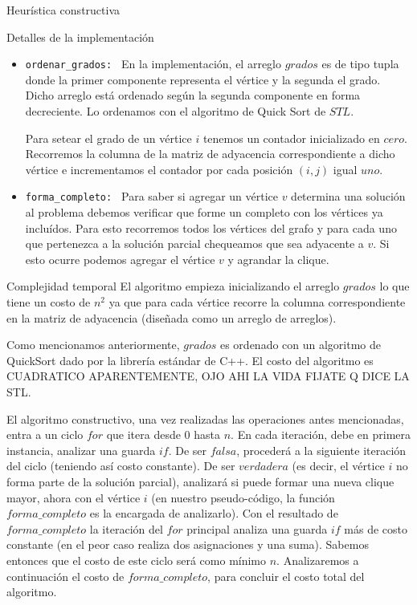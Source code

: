 \begin{section}{Heurística constructiva}
\begin{subsection}{Detalles de la implementación}
			\begin{itemize}
				\item \texttt{ordenar\_grados: } En la implementación, el arreglo $grados$ es de tipo tupla donde la primer componente representa el vértice y la segunda el grado. Dicho arreglo está ordenado según la segunda componente en forma decreciente. Lo ordenamos con el algoritmo de Quick Sort de $STL$.
				
				Para setear el grado de un vértice $i$ tenemos un contador inicializado en $cero$. Recorremos la columna de la matriz de adyacencia correspondiente a dicho vértice e incrementamos el contador por cada posición $(i,j)$ igual $uno$.
				\item \texttt{forma\_completo: } Para saber si agregar un vértice $v$ determina una solución al problema debemos verificar que forme un completo con los vértices ya incluídos. Para esto recorremos todos los vértices del grafo y para cada uno que pertenezca a la solución parcial chequeamos que sea adyacente a $v$. Si esto ocurre podemos agregar el vértice $v$ y agrandar la clique.
			\end{itemize}
		\end{subsection}
		\begin{subsection}{Complejidad temporal}
			El algoritmo empieza inicializando el arreglo $grados$ lo que tiene un costo de $n^2$ ya que para cada vértice recorre la columna correspondiente en la matriz de adyacencia (diseñada como un arreglo de arreglos).
			
			Como mencionamos anteriormente, $grados$ es ordenado con un algoritmo de QuickSort dado por la librería estándar de C++. El costo del algoritmo es CUADRATICO APARENTEMENTE, OJO AHI LA VIDA FIJATE Q DICE LA STL.
			
			El algoritmo constructivo, una vez realizadas las operaciones antes mencionadas, entra a un ciclo $for$ que itera desde $0$ hasta $n$. En cada iteración, debe en primera instancia, analizar una guarda $if$. De ser $falsa$, procederá a la siguiente iteración del ciclo (teniendo así costo constante). De ser $verdadera$ (es decir, el vértice $i$ no forma parte de la solución parcial), analizará si puede formar una nueva clique mayor, ahora con el vértice $i$ (en nuestro pseudo-código, la función $forma\_completo$ es la encargada de analizarlo). Con el resultado de $forma\_completo$ la iteración del $for$ principal analiza una guarda $if$ más de costo constante (en el peor caso realiza dos asignaciones y una suma). Sabemos entonces que el costo de este ciclo será como mínimo $n$. Analizaremos a continuación el costo de $forma\_completo$, para concluir el costo total del algoritmo.
			

\end{subsection}
\end{section}
